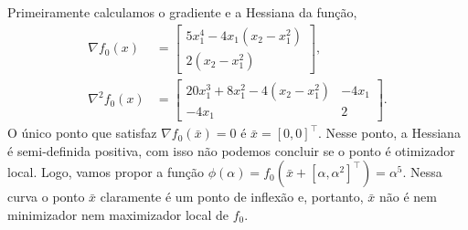 \begin{questions}
\begin{solution}

\end{solution}

\begin{solution}
	Primeiramente calculamos o gradiente e a Hessiana da função,
    \begin{align*}
    \nabla f_0(x) &= 
        \begin{bmatrix}
    		5 x_1^4 - 4 x_1 (x_2 - x_1^2) \\
            2 (x_2 - x_1^2)
		\end{bmatrix},\\
    \nabla^2 f_0(x) &= 
        \begin{bmatrix}
    		20 x_1^3 + 8 x_1^2 - 4 (x_2-x_1^2) & -4 x_1 \\
            -4 x_1 	&	 2
		\end{bmatrix}.
    \end{align*}
    O único ponto que satisfaz $\nabla f_0(\bar x) = 0$ é $\bar x = [0, 0]^\top $. Nesse ponto, a Hessiana é semi-definida positiva, com isso não podemos concluir se o ponto é otimizador local. Logo, vamos propor a função $\phi(\alpha) = f_0(\bar x+ [\alpha,\alpha^2]^\top ) = \alpha^5$. Nessa curva o ponto $\bar x$ claramente é um ponto de inflexão e, portanto, $\bar x$ não é nem minimizador nem maximizador local de $f_0$.
\end{solution}


\end{questions}
